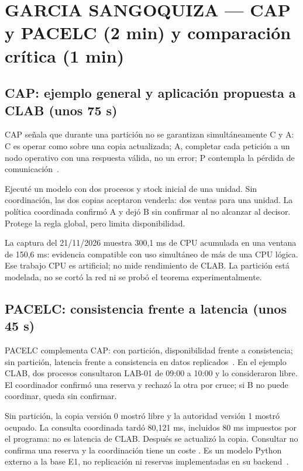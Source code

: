 \section*{GARCIA SANGOQUIZA — CAP y PACELC (2 min) y comparación crítica (1 min)}

\subsection*{CAP: ejemplo general y aplicación propuesta a CLAB (unos 75 s)}
CAP señala que durante una partición no se garantizan simultáneamente C y A:
C es operar como sobre una copia actualizada; A, completar cada petición a un
nodo operativo con una respuesta válida, no un error; P contempla la pérdida
de comunicación~\cite{gsGilbertLynch2002,gsIbmCap}.

Ejecuté un modelo con dos procesos y stock inicial de una unidad. Sin
coordinación, las dos copias aceptaron venderla: dos ventas para una unidad.
La política coordinada confirmó A y dejó B sin confirmar al no alcanzar al
decisor. Protege la regla global, pero limita disponibilidad.

La captura del 21/11/2026 muestra 300,1 ms de CPU acumulada en una ventana de
150,6 ms: evidencia compatible con uso simultáneo de más de una CPU lógica.
Ese trabajo CPU es artificial; no mide rendimiento de CLAB. La partición está
modelada, no se cortó la red ni se probó el teorema experimentalmente.

\subsection*{PACELC: consistencia frente a latencia (unos 45 s)}
PACELC complementa CAP: con partición, disponibilidad frente a consistencia;
sin partición, latencia frente a consistencia en datos
replicados~\cite{gsAbadi2012}.
En el ejemplo CLAB, dos procesos consultaron LAB-01 de 09:00 a 10:00 y lo
consideraron libre. El coordinador confirmó una reserva y rechazó la otra por
cruce; si B no puede coordinar, queda sin confirmar.

Sin partición, la copia versión 0 mostró libre y la autoridad versión 1 mostró
ocupado. La consulta coordinada tardó 80,121 ms, incluidos 80 ms impuestos por
el programa: no es latencia de CLAB. Después se actualizó la copia.
Consultar no confirma una reserva y la coordinación tiene un coste
\cite{gsMicrosoftConsistency2025}. Es un modelo Python externo a la base E1,
no replicación ni reservas implementadas en su backend~\cite{gsClabE1}.

